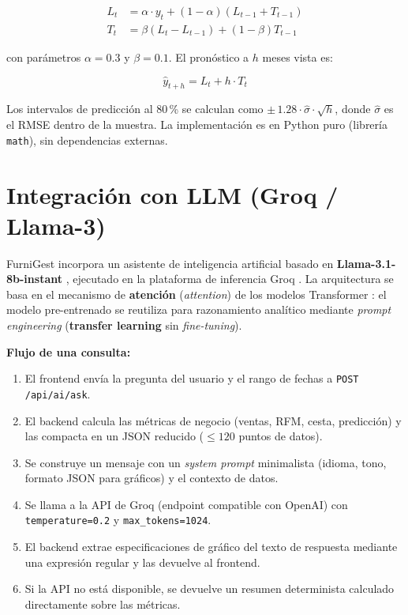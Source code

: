 \documentclass[12pt,twoside,titlepage]{report}
\begin{document}
\begin{align}
  L_t &= \alpha \cdot y_t + (1 - \alpha)(L_{t-1} + T_{t-1}) \\
  T_t &= \beta (L_t - L_{t-1}) + (1 - \beta) T_{t-1}
\end{align}

con parámetros $\alpha = 0.3$ y $\beta = 0.1$. El pronóstico a $h$ meses vista es:

\begin{equation}
  \hat{y}_{t+h} = L_t + h \cdot T_t
\end{equation}

Los intervalos de predicción al 80\,\% se calculan como $\pm\, 1.28 \cdot \hat{\sigma} \cdot \sqrt{h}$, donde $\hat{\sigma}$ es el RMSE dentro de la muestra. La implementación es en Python puro (librería \texttt{math}), sin dependencias externas.


\section{Integración con LLM (Groq / Llama-3)}

FurniGest incorpora un asistente de inteligencia artificial basado en \textbf{Llama-3.1-8b-instant} \cite{llama3}, ejecutado en la plataforma de inferencia Groq \cite{groq}. La arquitectura se basa en el mecanismo de \textbf{atención} (\emph{attention}) de los modelos Transformer \cite{vaswani2017}: el modelo pre-entrenado se reutiliza para razonamiento analítico mediante \emph{prompt engineering} (\textbf{transfer learning} sin \emph{fine-tuning}).

\textbf{Flujo de una consulta:}
\begin{enumerate}[nosep]
  \item El frontend envía la pregunta del usuario y el rango de fechas a \texttt{POST /api/ai/ask}.
  \item El backend calcula las métricas de negocio (ventas, RFM, cesta, predicción) y las compacta en un JSON reducido ($\leq 120$ puntos de datos).
  \item Se construye un mensaje con un \emph{system prompt} minimalista (idioma, tono, formato JSON para gráficos) y el contexto de datos.
  \item Se llama a la API de Groq (endpoint compatible con OpenAI) con \texttt{temperature=0.2} y \texttt{max\_tokens=1024}.
  \item El backend extrae especificaciones de gráfico del texto de respuesta mediante una expresión regular y las devuelve al frontend.
  \item Si la API no está disponible, se devuelve un resumen determinista calculado directamente sobre las métricas.
\end{enumerate}
\end{document}
